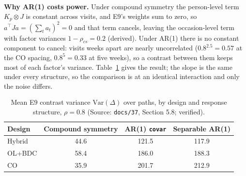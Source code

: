 \documentclass[11pt]{article}
\newcommand{\code}[1]{\texttt{#1}}
\begin{document}
\textbf{Why AR(1) costs power.} Under compound symmetry the
person-level term $K_p \otimes J$ is constant across visits, and E9's
weights sum to zero, so $a^\top J a = (\sum_t a_t)^2 = 0$ and that term
cancels, leaving the occasion-level term with factor variances
$1 - \rho_{cs} = 0.2$ (derived). Under AR(1) there is no constant component
to cancel: visits weeks apart are nearly uncorrelated
($0.8^{2.5} = 0.57$ at the CO spacing, $0.8^5 = 0.33$ at five weeks), so
a contrast between them keeps most of each factor's variance.
Table~\ref{tab:inve-var} gives the result; the slope is the same under
every structure, so the comparison is at an identical interaction and
only the noise differs.

\begin{table}[h]
\centering\small
\caption{Mean E9 contrast variance $\mathrm{Var}(\Delta)$ over paths,
by design and response structure, $\rho = 0.8$ (Source: \code{docs/37},
Section 5.8; verified).}
\label{tab:inve-var}
\begin{tabular}{@{}lccc@{}}
\toprule
Design & Compound symmetry & AR(1) \code{covar} & Separable AR(1) \\
\midrule
Hybrid & 44.6 & 121.5 & 117.9 \\
OL+BDC & 58.4 & 186.0 & 188.3 \\
CO     & 35.9 & 201.7 & 212.9 \\
\bottomrule
\end{tabular}
\end{table}
\end{document}
